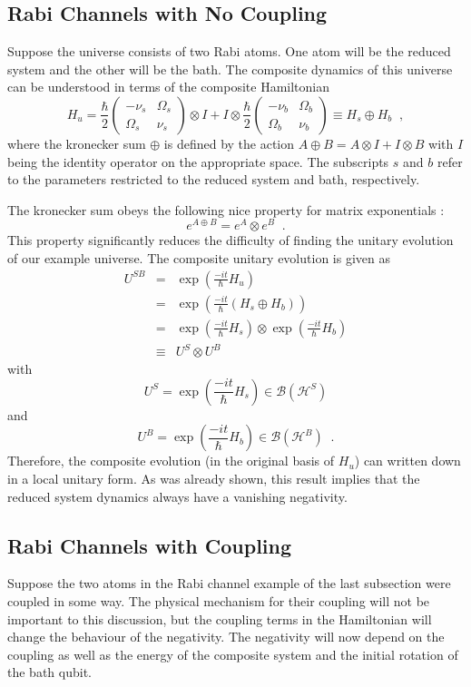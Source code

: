 \subsection{Rabi Channels with No Coupling}
\label{sec:rabinocoup}
Suppose the universe consists of two Rabi atoms.  One atom will be the reduced system and the other will be the bath.  The composite dynamics of this universe can be understood in terms of the composite Hamiltonian
$$
H_u = \frac{\hbar}{2}\begin{pmatrix}
-\nu_s & \Omega_s\\
\Omega_s & \nu_s
\end{pmatrix}\otimes I + I\otimes \frac{\hbar}{2}\begin{pmatrix}
-\nu_b & \Omega_b\\
\Omega_b & \nu_b
\end{pmatrix} \equiv H_s \oplus H_b\;\;,
$$
where the kronecker sum $\oplus$ is defined by the action $A\oplus B=A\otimes I+ I\otimes B$ with $I$ being the identity operator on the appropriate space.  The subscripts $s$ and $b$ refer to the parameters restricted to the reduced system and bath, respectively.

The kronecker sum obeys the following nice property for matrix exponentials \cite{Horn1990}:
$$
e^{A\oplus B} = e^A\otimes e^B\;\;.
$$
This property significantly reduces the difficulty of finding the unitary evolution of our example universe.  The composite unitary evolution is given as
\begin{eqnarray*}
U^{SB} &=& \exp\left(\frac{-it}{\hbar} H_u\right)\\
&=& \exp\left(\frac{-it}{\hbar} \left(H_s \oplus H_b\right)\right)\\
&=& \exp\left(\frac{-it}{\hbar} H_s \right) \otimes \exp\left(\frac{-it}{\hbar} H_b\right)\\
&\equiv & U^S\otimes U^B
\end{eqnarray*}
with
$$
U^S = \exp\left(\frac{-it}{\hbar} H_s \right) \in\mathcal{B}\left(\mathcal{H}^S\right)
$$
and
$$
U^B = \exp\left(\frac{-it}{\hbar} H_b \right) \in\mathcal{B}\left(\mathcal{H}^B\right)\;\;.
$$
Therefore, the composite evolution (in the original basis of $H_u$) can written down in a local unitary form.  As was already shown, this result implies that the reduced system dynamics always have a vanishing negativity.

\subsection{Rabi Channels with Coupling}
\label{sec:rabisub}
Suppose the two atoms in the Rabi channel example of the last subsection were coupled in some way.  The physical mechanism for their coupling will not be important to this discussion, but the coupling terms in the Hamiltonian will change the behaviour of the negativity.  The negativity will now depend on the coupling as well as the energy of the composite system and the initial rotation of the bath qubit.

